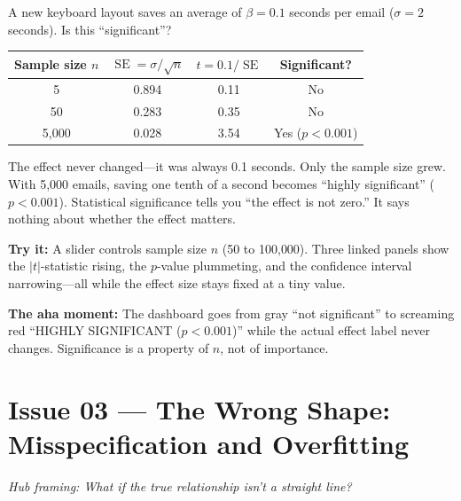 \documentclass[11pt,a4paper]{article}
\theoremstyle{definition}
\theoremstyle{plain}
\theoremstyle{remark}
\newcommand{\se}{\operatorname{SE}}
\begin{document}
\begin{numermark}[title={The Keyboard That Saves 0.1 Seconds}]
A new keyboard layout saves an average of $\beta = 0.1$ seconds per email ($\sigma = 2$ seconds). Is this ``significant''?

\begin{center}
\begin{tabular}{@{}cccc@{}}
\toprule
Sample size $n$ & $\se = \sigma/\sqrt{n}$ & $t = 0.1/\se$ & Significant? \\
\midrule
5 & 0.894 & 0.11 & No \\
50 & 0.283 & 0.35 & No \\
5{,}000 & 0.028 & 3.54 & Yes ($p < 0.001$) \\
\bottomrule
\end{tabular}
\end{center}

The effect never changed---it was always 0.1 seconds. Only the sample size grew. With 5{,}000 emails, saving one tenth of a second becomes ``highly significant'' ($p < 0.001$). Statistical significance tells you ``the effect is not zero.'' It says nothing about whether the effect matters.
\end{numermark}

\begin{vizspec}[title={``The Magnifying Glass That Can't Measure'' --- Sample Size Simulator}]
\textbf{Try it:} A slider controls sample size $n$ (50 to 100{,}000). Three linked panels show the $|t|$-statistic rising, the $p$-value plummeting, and the confidence interval narrowing---all while the effect size stays fixed at a tiny value.

\textbf{The aha moment:} The dashboard goes from gray ``not significant'' to screaming red ``HIGHLY SIGNIFICANT ($p < 0.001$)'' while the actual effect label never changes. Significance is a property of $n$, not of importance.
\end{vizspec}

\section{Issue 03 --- The Wrong Shape: Misspecification and Overfitting}\label{sec:specification}

\noindent\emph{Hub framing: What if the true relationship isn't a straight line?}
\end{document}

